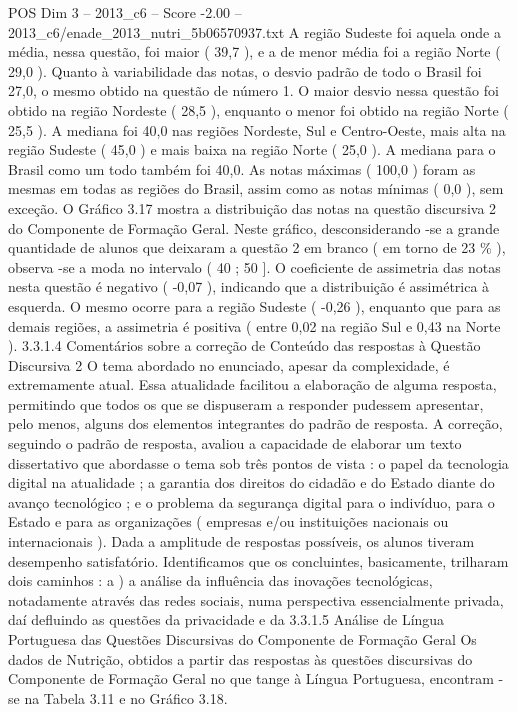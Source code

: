 \begin{textsample}{POS Dim 3 – 2013\_c6 – Score -2.00 – 2013\_c6/enade\_2013\_nutri\_5b06570937.txt}
A região Sudeste foi aquela onde a média, nessa questão, foi maior ( 39,7 ), e a de menor média foi a região Norte ( 29,0 ).
Quanto à variabilidade das notas, o desvio padrão de todo o Brasil foi 27,0, o mesmo obtido na questão de número 1.
O maior desvio nessa questão foi obtido na região Nordeste ( 28,5 ), enquanto o menor foi obtido na região Norte ( 25,5 ).
A mediana foi 40,0 nas regiões Nordeste, Sul e Centro-Oeste, mais alta na região Sudeste ( 45,0 ) e mais baixa na região Norte ( 25,0 ).
A mediana para o Brasil como um todo também foi 40,0.
As notas máximas ( 100,0 ) foram as mesmas em todas as regiões do Brasil, assim como as notas mínimas ( 0,0 ), sem exceção.
O Gráfico 3.17 mostra a distribuição das notas na questão discursiva 2 do Componente de Formação Geral.
Neste gráfico, desconsiderando -se a grande quantidade de alunos que deixaram a questão 2 em branco ( em torno de 23 \% ), observa -se a moda no intervalo ( 40 ; 50 ].
O coeficiente de assimetria das notas nesta questão é negativo ( -0,07 ), indicando que a distribuição é assimétrica à esquerda.
O mesmo ocorre para a região Sudeste ( -0,26 ), enquanto que para as demais regiões, a assimetria é positiva ( entre 0,02 na região Sul e 0,43 na Norte ). 3.3.1.4 Comentários sobre a correção de Conteúdo das respostas à Questão Discursiva 2 O tema abordado no enunciado, apesar da complexidade, é extremamente atual.
Essa atualidade facilitou a elaboração de alguma resposta, permitindo que todos os que se dispuseram a responder pudessem apresentar, pelo menos, alguns dos elementos integrantes do padrão de resposta.
A correção, seguindo o padrão de resposta, avaliou a capacidade de elaborar um texto dissertativo que abordasse o tema sob três pontos de vista : o papel da tecnologia digital na atualidade ; a garantia dos direitos do cidadão e do Estado diante do avanço tecnológico ; e o problema da segurança digital para o indivíduo, para o Estado e para as organizações ( empresas e/ou instituições nacionais ou internacionais ).
Dada a amplitude de respostas possíveis, os alunos tiveram desempenho satisfatório.
Identificamos que os concluintes, basicamente, trilharam dois caminhos : a ) a análise da influência das inovações tecnológicas, notadamente através das redes sociais, numa perspectiva essencialmente privada, daí defluindo as questões da privacidade e da 3.3.1.5 Análise de Língua Portuguesa das Questões Discursivas do Componente de Formação Geral Os dados de Nutrição, obtidos a partir das respostas às questões discursivas do Componente de Formação Geral no que tange à Língua Portuguesa, encontram -se na Tabela 3.11 e no Gráfico 3.18.

\end{textsample}
